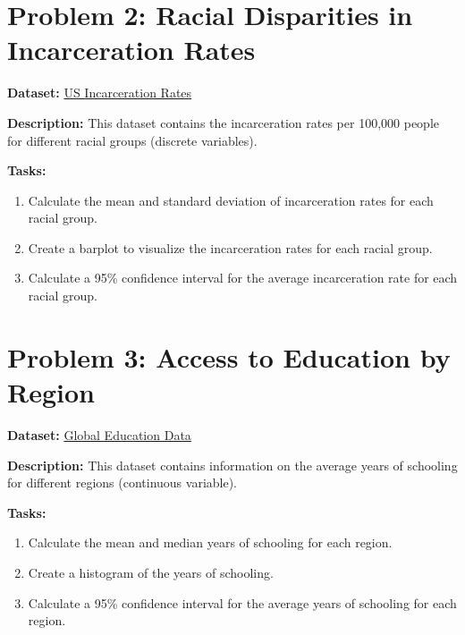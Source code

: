 \documentclass[
  letterpaper,
  DIV=11,
  numbers=noendperiod]{scrreprt}
\providecommand{\tightlist}{%
  \setlength{\itemsep}{0pt}\setlength{\parskip}{0pt}}\usepackage{longtable,booktabs,array}
\begin{document}
\section*{Problem 2: Racial Disparities in Incarceration
Rates}\label{problem-2-racial-disparities-in-incarceration-rates}


\textbf{Dataset:}
\href{https://www.prisonpolicy.org/reports/pie2020.html}{US
Incarceration Rates}

\textbf{Description:} This dataset contains the incarceration rates per
100,000 people for different racial groups (discrete variables).

\textbf{Tasks:}

\begin{enumerate}
\def\labelenumi{\arabic{enumi}.}
\tightlist
\item
  Calculate the mean and standard deviation of incarceration rates for
  each racial group.
\item
  Create a barplot to visualize the incarceration rates for each racial
  group.
\item
  Calculate a 95\% confidence interval for the average incarceration
  rate for each racial group.
\end{enumerate}

\section*{Problem 3: Access to Education by
Region}\label{problem-3-access-to-education-by-region}


\textbf{Dataset:}
\href{https://databank.worldbank.org/source/education-statistics}{Global
Education Data}

\textbf{Description:} This dataset contains information on the average
years of schooling for different regions (continuous variable).

\textbf{Tasks:}

\begin{enumerate}
\def\labelenumi{\arabic{enumi}.}
\tightlist
\item
  Calculate the mean and median years of schooling for each region.
\item
  Create a histogram of the years of schooling.
\item
  Calculate a 95\% confidence interval for the average years of
  schooling for each region.
\end{enumerate}
\end{document}
